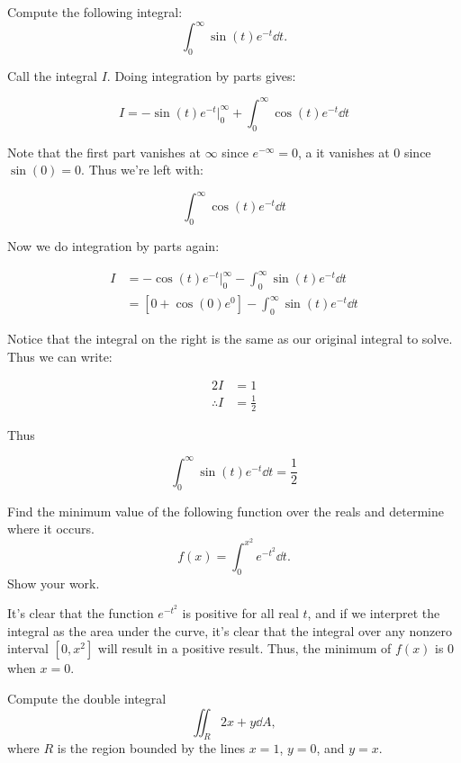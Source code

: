 \documentclass[11pt]{article}
\begin{document}
\begin{Parts}
    \Part Compute the following integral:
        \[
            \int_0^{\infty} \sin(t)e^{-t} \dd{t}.
        \]
    
    \begin{solution}
        Call the integral $I$. Doing integration by parts gives:

           \[ I = -\sin(t)e^{-t}\bigg\rvert_0^\infty + \int_0^\infty \cos(t)e^{-t}\dd{t}\]

           Note that the first part vanishes at $\infty$ since $e^{-\infty} = 0$, a it vanishes at $0$ since $\sin(0) = 0$. Thus we're left with:

           \[ \int_0^\infty \cos(t) e^{-t} \dd t\]

           Now we do integration by parts again: 


            \begin{align*}
                I &= -\cos(t)e^{-t} \bigg\rvert_0^\infty - \int_0^\infty \sin(t)e^{-t} \dd t\\
                &= [0 + \cos(0) e^0] - \int_0^\infty \sin(t) e^{-t} \dd t
            \end{align*}

            Notice that the integral on the right is the same as our original integral to solve. Thus we can write:

            \begin{align*}
                2I &= 1\\
                \therefore I &= \frac{1}{2}
            \end{align*}

            Thus

            \[ \int_0^\infty \sin(t) e^{-t} \dd t = \frac{1}{2}\]
    \end{solution}
    \Part Find the minimum value of the following function over the reals and determine where it occurs.
    \[f(x) = \int_{0}^{x^2} e^{-t^2} \dd{t}.\]
    Show your work.

    \begin{solution}
        It's clear that the function $e^{-t^2}$ is positive for all real $t$, and if we interpret the integral as the area under the curve, it's clear that the integral over any nonzero interval $[0, x^2]$ will result in a positive result. Thus, the minimum of $f(x)$ is 0 when $x = 0$.
    \end{solution}

    \Part Compute the double integral
    \[\iint_{R} 2x + y \dd{A},\]
    where $R$ is the region bounded by the lines $x = 1$, $y = 0$, and $y = x$.


\end{Parts}
\end{document}
